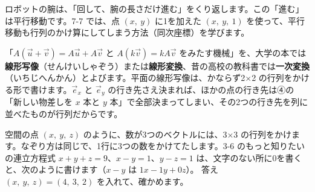 \begin{bkfigure}
\end{bkfigure}
ロボットの腕は、「回して、腕の長さだけ進む」をくり返します。この「進む」は平行移動です。7-7 では、点 $(x,\ y)$ に1を加えた $(x,\ y,\ 1)$ を使って、平行移動も行列のかけ算にしてしまう方法（同次座標）を学びます。

\begin{seikaku}
「$A(\vec u+\vec v)=A\vec u+A\vec v$ と $A(k\vec v)=kA\vec v$ をみたす機械」を、大学の本では\textbf{線形写像}（せんけいしゃぞう）または\textbf{線形変換}、昔の高校の教科書では\textbf{一次変換}（いちじへんかん）とよびます。平面の線形写像は、かならず2×2 の行列をかける形で書けます。$\vec e_x$ と $\vec e_y$ の行き先さえ決まれば、ほかの点の行き先は④の「新しい物差しを $x$ 本と $y$ 本」で全部決まってしまい、その2つの行き先を列に並べたものが行列だからです。
\end{seikaku}

\label{bk:7-2:sanji}

空間の点 $(x,\ y,\ z)$ のように、数が3つのベクトルには、3×3 の行列をかけます。なぞり方は同じで、1行に3つの数をかけてたします。3-6 のもっと知りたいの連立方程式 $x+y+z=9$、$x-y=1$、$y-z=1$ は、文字のない所に0を書くと、次のように書けます（$x-y$ は $1x-1y+0z$）。
答え $(x,\ y,\ z)=(4,\ 3,\ 2)$ を入れて、確かめます。

